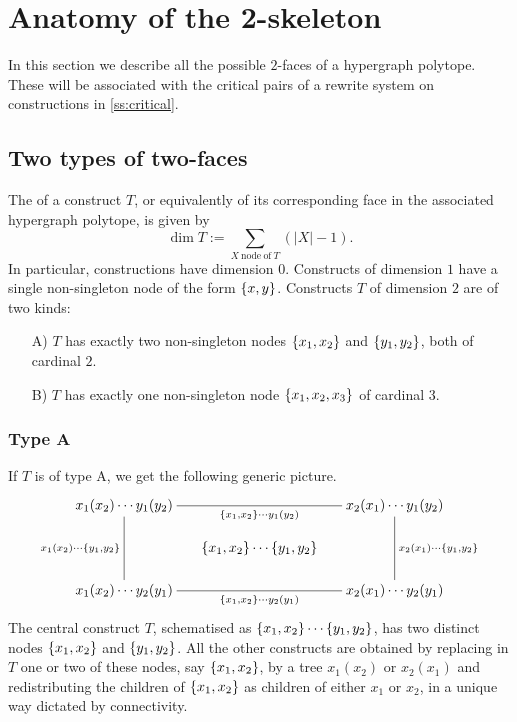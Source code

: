 
\section{Anatomy of the 2-skeleton} 
\label{s:anatomy}

In this section we describe all the possible $2$-faces of a hypergraph polytope.
These will be associated with the critical pairs of a rewrite system on constructions in \cref{ss:critical}.


\subsection{Two types of two-faces}
The  of a construct $T$, or equivalently of its corresponding face in the associated hypergraph polytope, is given by
$$\dim T :=\sum_{X\:\mathrm{node\: of}\: T}(|X|-1).$$
In particular, constructions have dimension $0$. 
Constructs of dimension $1$ have a single non-singleton node of the form $\left\{x,y\right\}$. 
Constructs $T$ of dimension $2$ are of two kinds:
\begin{itemize}
\item[A)]  $T$ has exactly two non-singleton nodes $\left\{x_1,x_2\right\}$ and $\left\{y_1,y_2\right\}$, both of cardinal $2$.
\item[B)] $T$ has exactly one non-singleton node $\left\{x_1,x_2,x_3\right\}$ of cardinal $3$.
\end{itemize}

\subsubsection{Type A}
If $T$ is of type A, we get the following generic picture.
$$ 
\xymatrix @-1.65pc { x_1(x_2)\cdots y_1(y_2) \ar @{-}[dddd]_{x_1(x_2)\cdots \set{y_1,y_2}} 
 \ar @{-}[rrrr]_{\set{x_1,x_2}\cdots y_1(y_2)} &&&& x_2(x_1)\cdots y_1(y_2) \ar @{-}[dddd]^{x_2(x_1)\cdots \set{y_1,y_2}} \\
 &&&&\\
 && \set{x_1,x_2} \cdots \set{y_1,y_2}&&\\
 &&&&\\
 x_1(x_2)\cdots y_2(y_1)  \ar @{-}[rrrr]_{\set{x_1,x_2}\cdots y_2(y_1)} &&  && x_2(x_1)\cdots y_2(y_1)}
 $$
The central construct $T$, schematised as $\left\{x_1,x_2\right\} \cdots \left\{y_1,y_2\right\}$, has two distinct nodes $\left\{x_1,x_2\right\}$ and $\left\{y_1,y_2\right\}$. 
All the other constructs are obtained by replacing in $T$ one or two of these nodes, say $\left\{x_1,x_2\right\}$, by a  tree $x_1(x_2)$ or $x_2(x_1)$ and redistributing the children of  $\left\{x_1,x_2\right\}$  as children of either $x_1$ or $x_2$, in a unique way dictated by connectivity. 

